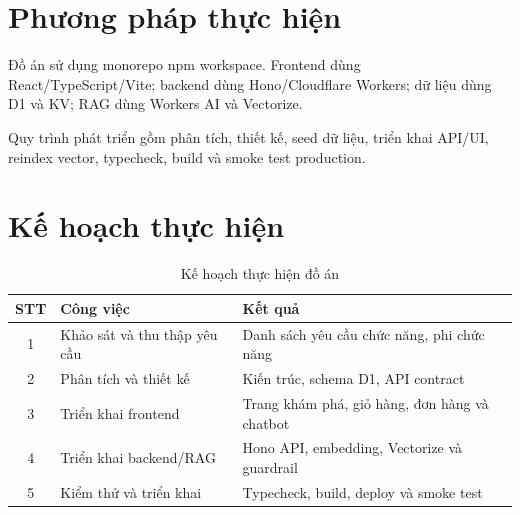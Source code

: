 \section{Phương pháp thực hiện}
Đồ án sử dụng monorepo npm workspace. Frontend dùng React/TypeScript/Vite; backend dùng Hono/Cloudflare Workers; dữ liệu dùng D1 và KV; RAG dùng Workers AI và Vectorize.

Quy trình phát triển gồm phân tích, thiết kế, seed dữ liệu, triển khai API/UI, reindex vector, typecheck, build và smoke test production.

\section{Kế hoạch thực hiện}
\begin{table}[H]
\centering
\caption{Kế hoạch thực hiện đồ án}
\label{tab:ke-hoach}
\begin{tabular}{|c|p{4.5cm}|p{6.5cm}|}
\hline
\textbf{STT} & \textbf{Công việc} & \textbf{Kết quả} \\
\hline
1 & Khảo sát và thu thập yêu cầu & Danh sách yêu cầu chức năng, phi chức năng \\
\hline
2 & Phân tích và thiết kế & Kiến trúc, schema D1, API contract \\
\hline
3 & Triển khai frontend & Trang khám phá, giỏ hàng, đơn hàng và chatbot \\
\hline
4 & Triển khai backend/RAG & Hono API, embedding, Vectorize và guardrail \\
\hline
5 & Kiểm thử và triển khai & Typecheck, build, deploy và smoke test \\
\hline
\end{tabular}
\end{table}
